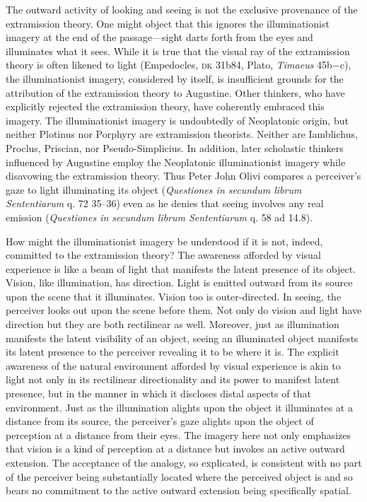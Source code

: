 \documentclass[12pt]{article}
\begin{document}
The outward activity of looking and seeing is not the exclusive provenance of the extramission theory. One might object that this ignores the illuminationist imagery at the end of the passage---sight darts forth from the eyes and illuminates what it sees. While it is true that the visual ray of the extramission theory is often likened to light (Empedocles, \textsc{dk} 31b84, Plato, \emph{Timaeus} 45b−c), the illuminationist imagery, considered by itself, is insufficient grounds for the attribution of the extramission theory to Augustine. Other thinkers, who have explicitly rejected the extramission theory, have coherently embraced this imagery. The illuminationist imagery is undoubtedly of Neoplatonic origin, but neither Plotinus nor Porphyry are extramission theorists. Neither are Iamblichus, Proclus, Priscian, nor Pseudo-Simplicius. In addition, later scholastic thinkers influenced by Augustine employ the Neoplatonic illuminationist imagery while disavowing the extramission theory. Thus Peter John Olivi compares a perceiver's gaze to light illuminating its object (\emph{Questiones in secundum librum Sententiarum} q. 72 35–36) even as he denies that seeing involves any real emission (\emph{Questiones in secundum librum Sententiarum} q. 58 ad 14.8). 

How might the illuminationist imagery be understood if it is not, indeed, committed to the extramission theory? The awareness afforded by visual experience is like a beam of light that manifests the latent presence of its object. Vision, like illumination, has direction. Light is emitted outward from its source upon the scene that it illuminates. Vision too is outer-directed. In seeing, the perceiver looks out upon the scene before them. Not only do vision and light have direction but they are both rectilinear as well. Moreover, just as illumination manifests the latent visibility of an object, seeing an illuminated object manifests its latent presence to the perceiver revealing it to be where it is. The explicit awareness of the natural environment afforded by visual experience is akin to light not only in its rectilinear directionality and its power to manifest latent presence, but in the manner in which it discloses distal aspects of that environment. Just as the illumination alights upon the object it illuminates at a distance from its source, the perceiver’s gaze alights upon the object of perception at a distance from their eyes. The imagery here not only emphasizes that vision is a kind of perception at a distance but invokes an active outward extension. The acceptance of the analogy, so explicated, is consistent with no part of the perceiver being substantially located where the perceived object is and so bears no commitment to the active outward extension being specifically spatial. 
\end{document}
